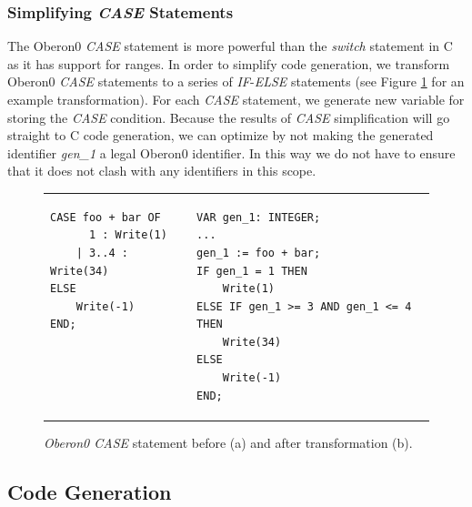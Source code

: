 \subsubsection{\label{sub:Simplifying-CASE-Statements}Simplifying \emph{CASE} Statements}

The Oberon0 \emph{CASE} statement is more powerful than the \emph{switch}
statement in C as it has support for ranges. In order to simplify
code generation, we transform Oberon0 \emph{CASE} statements to a
series of \emph{IF}-\emph{ELSE }statements (see Figure \ref{fig:CASE-statement}
for an example transformation). For each \emph{CASE }statement, we
generate new variable for storing the \emph{CASE} condition. Because
the results of \emph{CASE} simplification will go straight to C code
generation, we can optimize by not making the generated identifier
\emph{gen\_1} a legal Oberon0 identifier. In this way we do not have
to ensure that it does not clash with any identifiers in this scope.

\begin{figure}[!h]
\begin{tabular}{>{\centering}p{}>{\centering}p{}}
{\footnotesize }
\begin{lstlisting}[basicstyle={\footnotesize\ttfamily},showlines=true]
CASE foo + bar OF
      1 : Write(1)
    | 3..4 : Write(34)
ELSE
    Write(-1)
END;
 
 
  
 
\end{lstlisting}
{\footnotesize \par}

\subfloat[\label{fig:case-before}]{} & {\footnotesize }
\begin{lstlisting}[basicstyle={\footnotesize\ttfamily}]
VAR gen_1: INTEGER;
...
gen_1 := foo + bar;
IF gen_1 = 1 THEN
    Write(1)
ELSE IF gen_1 >= 3 AND gen_1 <= 4 THEN
    Write(34)
ELSE
    Write(-1)
END;
\end{lstlisting}
{\footnotesize \par}

\subfloat[\label{fig:case-after}]{}\tabularnewline
\end{tabular}

\caption{\emph{\label{fig:CASE-statement}Oberon0 CASE} statement before (a)
and after transformation (b).}
\end{figure}



\subsection{Code Generation}

